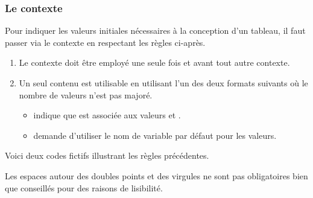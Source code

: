 \documentclass[10pt, a4paper]{article}
\begin{document}

\subsubsection{Le contexte }
\label{tns-math-functab-ctxt-bounds}

Pour indiquer les valeurs initiales nécessaires à la conception d'un tableau, il faut passer via le contexte  en respectant les règles ci-après.
\begin{enumerate}
    \item Le contexte  doit être employé une seule fois et avant tout autre contexte.


    \item Un seul contenu est utilisable en utilisant l'un des deux formats suivants où le nombre de valeurs n'est pas majoré.
    \begin{itemize}
        \item {} indique que  est associée aux valeurs  et  .

        \item {} demande d'utiliser le nom de variable par défaut pour les valeurs.
    \end{itemize}
\end{enumerate}


\medskip


Voici deux codes fictifs illustrant les règles précédentes.
\begin{multicols}{2}

\end{multicols}




\begin{tdocnote}
    Les espaces autour des doubles points et des virgules ne sont pas obligatoires bien que conseillés pour des raisons de lisibilité.
\end{tdocnote}
\end{document}
